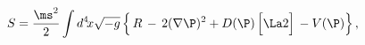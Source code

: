 \begin{equation}\label{act3}
S = \frac{\ms^2}{2} \int d^{4} \! x \sqrt{- g}\,\Big\{\, R\,-\, 2 (\nabla \P)^2 + D(\P)\, \Big[\La2 \Big] \, - V(\P)\Big\}
\,,
\end{equation}


